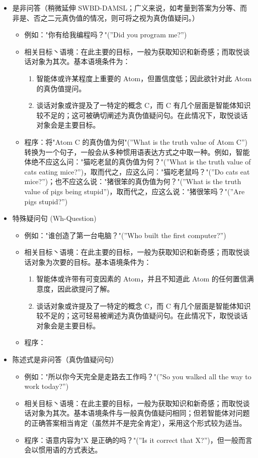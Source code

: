 \begin{itemize}


\item 是非问答（稍微延伸 SWBD-DAMSL；广义来说，如考量到答案为分等、而非是、否之二元真伪值的情况，则可将之视为真伪值疑问。）
\begin{itemize}
\item 例如："你有给我编程吗？"(”Did you program me?”)
\item 相关目标丶语境：在此主要的目标，一般为获取知识和新奇感；而取悦谈话对象为其次。基本语境条件为：
\begin{enumerate}
\item 智能体或许某程度上重要的 Atom，但置信度低；因此欲针对此 Atom 的真伪值提问。
\item 谈话对象或许提及了一特定的概念 C，而 C 有几个层面是智能体知识较不足的；这可被确切阐述为真伪值疑问句。在此情况下，取悦谈话对象会是主要目标。
\end{enumerate}
\item 程序：将"Atom C 的真伪值为何"(”What is the truth value of Atom C”) 转换为一个句子，一般会从多种惯用语表达方式之中取一种。例如，智能体绝不应这么问："猫吃老鼠的真伪值为何？"(”What is the truth value of cats eating mice?”)，取而代之，应这么问："猫吃老鼠吗？"(”Do cats eat mice?”)；也不应这么说："猪很笨的真伪值为何？"(”What is the truth value of pigs being stupid”)，取而代之，应这么说："猪很笨吗？"(”Are pigs stupid?”)
\end{itemize}


\item 特殊疑问句 (Wh-Question)
\begin{itemize}
\item 例如："谁创造了第一台电脑？"(”Who built the first computer?”)
\item 相关目标丶语境：在此主要的目标，一般为获取知识和新奇感；而取悦谈话对象为次要的目标。基本语境条件为：
\begin{enumerate}
\item 智能体或许带有可变因素的 Atom，并且不知道此 Atom 的任何置信满意度，因此欲提问了解。 
\item 谈话对象或许提及了一特定的概念 C，而 C 有几个层面是智能体知识较不足的；这可轻易被阐述为真伪值疑问句。在此情况下，取悦谈话对象会是主要目标。
\end{enumerate}
\item 程序：
\end{itemize}


\item 陈述式是非问答（真伪值疑问句）
\begin{itemize}
\item 例如："所以你今天完全是走路去工作吗？"(”So you walked all the way to work today?”)
\item 相关目标丶语境：在此主要的目标，一般为获取知识和新奇感；而取悦谈话对象为其次。基本语境条件与一般真伪值疑问相同；但若智能体对问题的正确答案相当肯定（虽然并不是完全肯定），采用这个形式较为适当。 
\item 程序：语意内容为"X 是正确的吗？"(”Is it correct that X?”)，但一般而言会以惯用语的方式表达。
\end{itemize}



\end{itemize}
